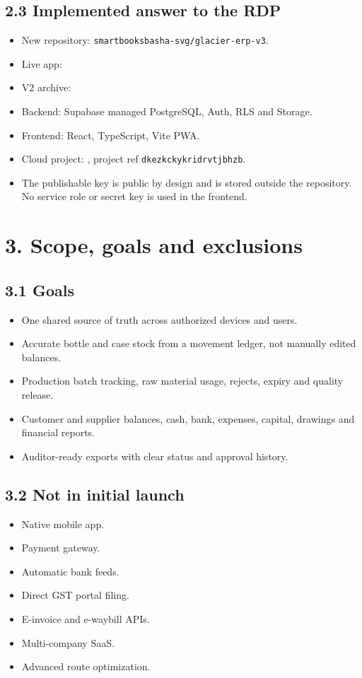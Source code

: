 \documentclass[11pt]{article}
\begin{document}
\subsection{2.3 Implemented answer to the RDP}
\begin{itemize}[leftmargin=*,itemsep=2pt,topsep=2pt]
\item New repository: \texttt{smartbooksbasha-svg/glacier-erp-v3}.
\item Live app: 
\item V2 archive: 
\item Backend: Supabase managed PostgreSQL, Auth, RLS and Storage.
\item Frontend: React, TypeScript, Vite PWA.
\item Cloud project: , project ref \texttt{dkezkckykridrvtjbhzb}.
\item The publishable key is public by design and is stored outside the repository. No service role or secret key is used in the frontend.
\end{itemize}
\clearpage
\section{3. Scope, goals and exclusions}
\subsection{3.1 Goals}
\begin{itemize}[leftmargin=*,itemsep=2pt,topsep=2pt]
\item One shared source of truth across authorized devices and users.
\item Accurate bottle and case stock from a movement ledger, not manually edited balances.
\item Production batch tracking, raw material usage, rejects, expiry and quality release.
\item Customer and supplier balances, cash, bank, expenses, capital, drawings and financial reports.
\item Auditor-ready exports with clear status and approval history.
\end{itemize}
\subsection{3.2 Not in initial launch}
\begin{itemize}[leftmargin=*,itemsep=2pt,topsep=2pt]
\item Native mobile app.
\item Payment gateway.
\item Automatic bank feeds.
\item Direct GST portal filing.
\item E-invoice and e-waybill APIs.
\item Multi-company SaaS.
\item Advanced route optimization.
\end{itemize}
\clearpage
\end{document}

